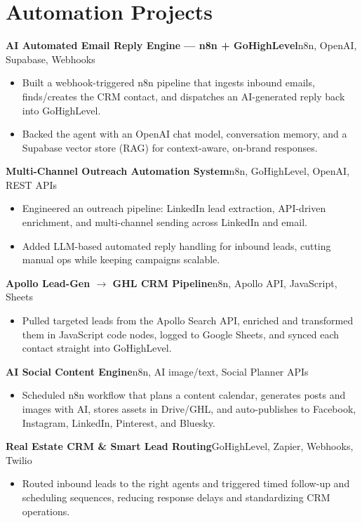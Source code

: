 \documentclass[a4paper,11pt]{article}
\newcommand{\dtitle}[2]{\textbf{#1}\hfill{\color{muted}\small #2}\\}
\begin{document}
\section{Automation Projects}

\dtitle{AI Automated Email Reply Engine — n8n + GoHighLevel}{n8n, OpenAI, Supabase, Webhooks}
\begin{itemize}
  \item Built a webhook-triggered n8n pipeline that ingests inbound emails, finds/creates the CRM contact, and dispatches an AI-generated reply back into GoHighLevel.
  \item Backed the agent with an OpenAI chat model, conversation memory, and a Supabase vector store (RAG) for context-aware, on-brand responses.
\end{itemize}

\dtitle{Multi-Channel Outreach Automation System}{n8n, GoHighLevel, OpenAI, REST APIs}
\begin{itemize}
  \item Engineered an outreach pipeline: LinkedIn lead extraction, API-driven enrichment, and multi-channel sending across LinkedIn and email.
  \item Added LLM-based automated reply handling for inbound leads, cutting manual ops while keeping campaigns scalable.
\end{itemize}

\dtitle{Apollo Lead-Gen $\rightarrow$ GHL CRM Pipeline}{n8n, Apollo API, JavaScript, Sheets}
\begin{itemize}
  \item Pulled targeted leads from the Apollo Search API, enriched and transformed them in JavaScript code nodes, logged to Google Sheets, and synced each contact straight into GoHighLevel.
\end{itemize}

\dtitle{AI Social Content Engine}{n8n, AI image/text, Social Planner APIs}
\begin{itemize}
  \item Scheduled n8n workflow that plans a content calendar, generates posts and images with AI, stores assets in Drive/GHL, and auto-publishes to Facebook, Instagram, LinkedIn, Pinterest, and Bluesky.
\end{itemize}

\dtitle{Real Estate CRM \& Smart Lead Routing}{GoHighLevel, Zapier, Webhooks, Twilio}
\begin{itemize}
  \item Routed inbound leads to the right agents and triggered timed follow-up and scheduling sequences, reducing response delays and standardizing CRM operations.
\end{itemize}
\end{document}
